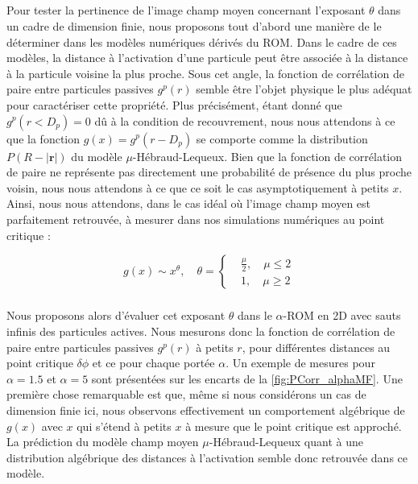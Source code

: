\subparagraph{}Pour tester la pertinence de l'image champ moyen concernant l'exposant $\theta$ dans un cadre de dimension finie, nous proposons tout d'abord une manière de le déterminer dans les modèles numériques dérivés du ROM. Dans le cadre de ces modèles, la distance à l'activation d'une particule peut être associée à la distance à la particule voisine la plus proche. Sous cet angle, la fonction de corrélation de paire entre particules passives $g^p(r)$ semble être l'objet physique le plus adéquat pour caractériser cette propriété. Plus précisément, étant donné que $g^p(r<D_p)=0$ dû à la condition de recouvrement, nous nous attendons à ce que la fonction $g(x) = g^p(r-D_p)$ se comporte comme la distribution $P(R-|\mathbf{r}|)$ du modèle $\mu$-Hébraud-Lequeux. Bien que la fonction de corrélation de paire ne représente pas directement une probabilité de présence du plus proche voisin, nous nous attendons à ce que ce soit le cas asymptotiquement à petits $x$. Ainsi, nous nous attendons, dans le cas idéal où l'image champ moyen est parfaitement retrouvée, à mesurer dans nos simulations numériques au point critique :

\begin{equation}
	g(x) \sim x^\theta, \quad \theta = \left\{
	\begin{aligned}
	&\frac{\mu}{2}, \quad \mu \leq 2\\
	&1, \quad \mu \geq 2
	\end{aligned}
	\right.
	\label{eq:gpass}
\end{equation}

\subparagraph{}Nous proposons alors d'évaluer cet exposant $\theta$ dans le $\alpha$-ROM en 2D avec sauts infinis des particules actives. Nous mesurons donc la fonction de corrélation de paire entre particules passives $g^p(r)$ à petits $r$, pour différentes distances au point critique $\delta\phi$ et ce pour chaque portée $\alpha$. Un exemple de mesures pour $\alpha = 1.5$ et $\alpha = 5$ sont présentées sur les encarts de la \autoref{fig:PCorr_alphaMF}. Une première chose remarquable est que, même si nous considérons un cas de dimension finie ici, nous observons effectivement un comportement algébrique de $g(x)$ avec $x$ qui s'étend à petits $x$ à mesure que le point critique est approché. La prédiction du modèle champ moyen $\mu$-Hébraud-Lequeux quant à une distribution algébrique des distances à l'activation semble donc retrouvée dans ce modèle.


